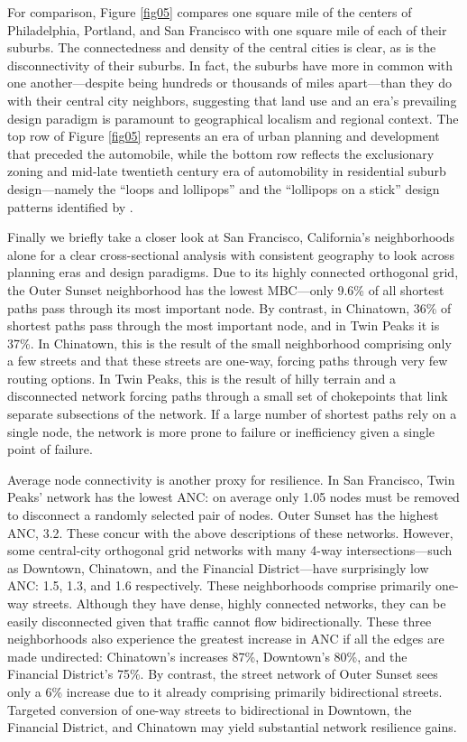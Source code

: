 \documentclass{article}
\begin{document}
For comparison, Figure \ref{fig05} compares one square mile of the centers of Philadelphia, Portland, and San Francisco with one square mile of each of their suburbs. The connectedness and density of the central cities is clear, as is the disconnectivity of their suburbs. In fact, the suburbs have more in common with one another---despite being hundreds or thousands of miles apart---than they do with their central city neighbors, suggesting that land use and an era's prevailing design paradigm is paramount to geographical localism and regional context. The top row of Figure \ref{fig05} represents an era of urban planning and development that preceded the automobile, while the bottom row reflects the exclusionary zoning and mid-late twentieth century era of automobility in residential suburb design---namely the \enquote{loops and lollipops} and the \enquote{lollipops on a stick} design patterns identified by \citet{southworth_streets_1997}.

Finally we briefly take a closer look at San Francisco, California's neighborhoods alone for a clear cross-sectional analysis with consistent geography to look across planning eras and design paradigms. Due to its highly connected orthogonal grid, the Outer Sunset neighborhood has the lowest MBC---only 9.6\% of all shortest paths pass through its most important node. By contrast, in Chinatown, 36\% of shortest paths pass through the most important node, and in Twin Peaks it is 37\%. In Chinatown, this is the result of the small neighborhood comprising only a few streets and that these streets are one-way, forcing paths through very few routing options. In Twin Peaks, this is the result of hilly terrain and a disconnected network forcing paths through a small set of chokepoints that link separate subsections of the network. If a large number of shortest paths rely on a single node, the network is more prone to failure or inefficiency given a single point of failure.

Average node connectivity is another proxy for resilience. In San Francisco, Twin Peaks' network has the lowest ANC: on average only 1.05 nodes must be removed to disconnect a randomly selected pair of nodes. Outer Sunset has the highest ANC, 3.2. These concur with the above descriptions of these networks. However, some central-city orthogonal grid networks with many 4-way intersections---such as Downtown, Chinatown, and the Financial District---have surprisingly low ANC: 1.5, 1.3, and 1.6 respectively. These neighborhoods comprise primarily one-way streets. Although they have dense, highly connected networks, they can be easily disconnected given that traffic cannot flow bidirectionally. These three neighborhoods also experience the greatest increase in ANC if all the edges are made undirected: Chinatown's increases 87\%, Downtown's 80\%, and the Financial District's 75\%. By contrast, the street network of Outer Sunset sees only a 6\% increase due to it already comprising primarily bidirectional streets. Targeted conversion of one-way streets to bidirectional in Downtown, the Financial District, and Chinatown may yield substantial network resilience gains.
\end{document}
